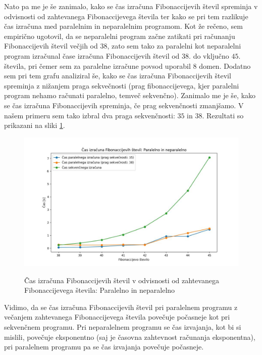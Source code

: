 \documentclass[mat1, tisk]{fmfdelo}
\begin{document}
Nato pa me je še zanimalo, kako se čas izračuna Fibonaccijevih števil spreminja v odvisnosti od zahtevanega
Fibonaccijevega števila ter kako se pri tem razlikuje čas izračuna med paralelnim in neparalelnim programom.
Kot že rečeno, sem empirično ugotovil, da se neparalelni program začne zatikati pri računanju Fibonaccijevih števil
večjih od $38$, zato sem tako za paralelni kot neparalelni program izračunal čase izračuna Fibonaccijevih števil od $38.$
do vključno $45.$ števila, pri čemer sem za paralelne izračune povsod uporabil $8$ domen. Dodatno sem pri tem grafu
analiziral še, kako se čas izračuna Fibonaccijevih števil spreminja z nižanjem praga sekvečnosti (prag fibonaccijevega,
kjer paralelni program nehamo računati paralelno, temveč sekvenčno). Zanimalo me je še, kako se čas izračuna
Fibonaccijevih spreminja, če prag sekvenčnosti zmanjšamo. V našem primeru sem tako izbral dva praga sekvenčnosti:
$35$ in $38$. Rezultati so prikazani na sliki \ref{fig:fib_par_v_odvisnosti_od_n}.

\begin{figure}[h!]
  \centering
  \caption{Čas izračuna Fibonaccijevih števil v odvisnosti od zahtevanega Fibonaccijevega števila: Paralelno in neparalelno}
  \includegraphics[width=15cm]{slike/fib_par_v_odvisnosti_od_n.jpg}
  \label{fig:fib_par_v_odvisnosti_od_n}
\end{figure}

Vidimo, da se čas izračuna Fibonaccijevih števil pri paralelnem programu z večanjem zahtevanega Fibonaccijevega števila
povečuje počasneje kot pri sekvenčnem programu. Pri neparalelnem programu se čas izvajanja, kot bi
si mislili, povečuje eksponentno (saj je časovna zahtevnost računanja eksponentna), pri paralelnem programu pa se čas
izvajanja povečuje počasneje.
\end{document}
